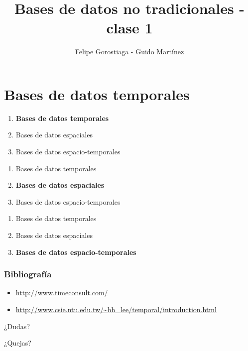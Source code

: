 \documentclass[obeyspaces,spaces,hyphens]{beamer}
\begin{document}
\title{Bases de datos no tradicionales - clase 1}
\author{Felipe Gorostiaga - Guido Martínez}

\begin{frame}
  \titlepage
\end{frame}

\section{Bases de datos temporales}

\begin{frame}
	\begin{enumerate}
	\item {\bf Bases de datos temporales}
	\item Bases de datos espaciales
	\item Bases de datos espacio-temporales
	\end{enumerate}
\end{frame}



\begin{frame}
	\begin{enumerate}
	\item Bases de datos temporales
	\item {\bf Bases de datos espaciales}
	\item Bases de datos espacio-temporales
	\end{enumerate}
\end{frame}

\begin{frame}
	\begin{enumerate}
	\item Bases de datos temporales
	\item Bases de datos espaciales
	\item {\bf Bases de datos espacio-temporales}
	\end{enumerate}
\end{frame}

\begin{frame}
\frametitle{Bibliografía}
\begin{itemize}
	\item \url{http://www.timeconsult.com/}
	\item \url{http://www.csie.ntu.edu.tw/~hh_lee/temporal/introduction.html}
\end{itemize}
\end{frame}

\begin{frame}
\begin{center}
	¿Dudas?
	\pause

	¿Quejas?
\end{center}
\end{frame}
\end{document}
